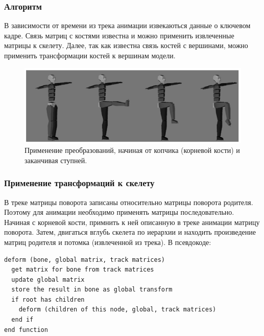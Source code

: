 \documentclass{beamer}
\begin{document}
\begin{frame}
\frametitle{Алгоритм}
\begin{scriptsize}
В зависимости от времени из трека анимации извекаються данные о ключевом кадре.
Связь матриц с костями известна и можно применить извлеченные матрицы к скелету. 
Далее, так как известна связь костей с вершинами, можно применить трансформации костей к вершинам модели.

\begin{figure}[h!]
    \centering
    \includegraphics[width=1\textwidth]{forward_kinematics.png}
    \caption{\scriptsize{Применение преобразований, начиная от копчика (корневой кости) и заканчивая ступней.}}
\end{figure}

\end{scriptsize}
\end{frame}


\begin{frame}[fragile]
\frametitle{Применение трансформаций к скелету}
В треке матрицы поворота записаны относительно матрицы поворота родителя. 
Поэтому для анимации необходимо применять матрицы последовательно.
Начиная с корневой кости, примнить к ней описанную в треке анимации матрицу поворота.
Затем, двигаться вглубь скелета по иерархии и находить произведение матриц родителя и потомка (извлеченной из трека). В псевдокоде:
    
\begin{scriptsize}
\begin{lstlisting}
deform (bone, global matrix, track matrices)
  get matrix for bone from track matrices
  update global matrix
  store the result in bone as global transform
  if root has children
    deform (children of this node, global, track matrices)
  end if
end function
\end{lstlisting}
\end{scriptsize}

\end{frame}
\end{document}
